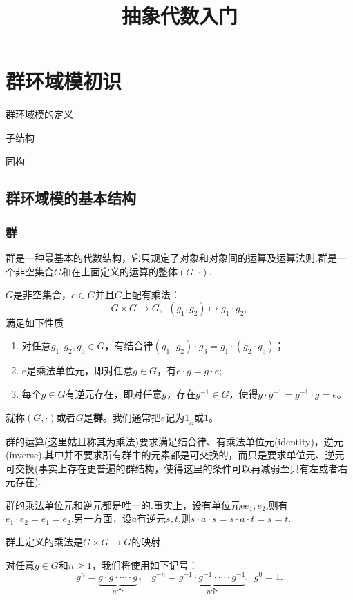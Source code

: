 \documentclass[lang=cn,10pt]{elegantbook}
\title{抽象代数入门}
\begin{document}
	
	
	\maketitle
	\frontmatter
	
	\tableofcontents
	
	\mainmatter
	\chapter{群环域模初识}
	\begin{introduction}
		\item 群环域模的定义
		\item 子结构
		\item 同构
	\end{introduction}
	\section{群环域模的基本结构}
	\subsection{群}
	群是一种最基本的代数结构，它只规定了对象和对象间的运算及运算法则.群是一个非空集合\(G\)和在上面定义的运算的整体\((G,\cdot)\).
	\begin{definition}[群]
		$G$是非空集合，$e \in G$并且$G$上配有乘法：
		\[G\times G\rightarrow G,  \ \ (g_1,g_2)\mapsto g_1\cdot g_2,\]
		满足如下性质
		\begin{enumerate}
			\item  对任意$g_1,g_2,g_3\in G$，有结合律$(g_1\cdot g_2)\cdot g_3=g_1\cdot (g_2 \cdot g_3)$；
			\item  $e$是乘法单位元，即对任意$g\in G$，有$e\cdot g=g\cdot e$;
			\item  每个$g\in G$有逆元存在，即对任意$g$，存在$g^{-1}\in G$，使得$g\cdot g^{-1}=g^{-1}\cdot g=e$。
		\end{enumerate}
		就称$(G,\cdot)$或者$G$是{\bf 群}。我们通常把$e$记为$1_{_G}$或$1$。
	\end{definition}
	\begin{note}
		群的运算(这里姑且称其为乘法)要求满足结合律、有乘法单位元(identity)，逆元(inverse).其中并不要求所有群中的元素都是可交换的，而只是要求单位元、逆元可交换(事实上存在更普遍的群结构，使得这里的条件可以再减弱至只有左或者右元存在).
		
		群的乘法单位元和逆元都是唯一的.事实上，设有单位元e\(e_1,e_2\),则有\(e_1\cdot e_2=e_1=e_2.\)另一方面，设\(a\)有逆元\(s,t\),则\(s\cdot a \cdot s=s\cdot a \cdot t=s=t.\)
		
		群上定义的乘法是\(G\times G\rightarrow G\)的映射.
	\end{note}
	对任意$g\in G$和$n\geqslant 1$，我们将使用如下记号：
	\[g^n=\underbrace{g\cdot g\cdot \cdots \cdot g}_{n 个}， \ \ g^{-n}=\underbrace{g^{-1}\cdot g^{-1}\cdot \cdots \cdot g^{-1}}_{n 个},  \ \ g^0=1.\]
	
\end{document}
